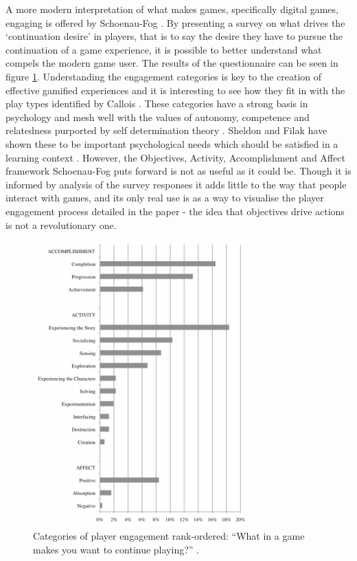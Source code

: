 \documentclass[12pt,a4paper,twoside]{report}
\begin{document}
A more modern interpretation of what makes games, specifically digital games, engaging is offered by Schoenau-Fog \cite{schoenau2011player}. By presenting a survey on what drives the `continuation desire' in players, that is to say the desire they have to pursue the continuation of a game experience, it is possible to better understand what compels the modern game user. The results of the questionnaire can be seen in figure \ref{fog}. Understanding the engagement categories is key to the creation of effective gamified experiences and it is interesting to see how they fit in with the play types identified by Callois \cite{caillois1961man}. These categories have a strong basis in psychology and mesh well with the values of autonomy, competence and relatedness purported by self determination theory \cite{deci1985intrinsic}. Sheldon and Filak have shown these to be important psychological needs which should be satisfied in a learning context \cite{sheldon2008manipulating}. However, the Objectives, Activity, Accomplishment and Affect framework Schoenau-Fog puts forward is not as useful as it could be. Though it is informed by analysis of the survey responses it adds little to the way that people interact with games, and its only real use is as a way to visualise the player engagement process detailed in the paper - the idea that objectives drive actions is not a revolutionary one.

\begin{figure}
\begin{center}
	\includegraphics[width=0.75\textwidth]{../img/fog.png}
	\caption{Categories of player engagement rank-ordered: ``What in a game makes you want to continue playing?'' \cite{schoenau2011player}.}
	\label{fog}
\end{center}
\end{figure}
\end{document}
